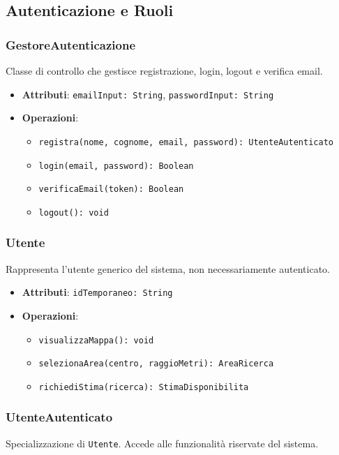 \documentclass[12pt,a4paper]{article}
\begin{document}
\subsection{Autenticazione e Ruoli}

\subsubsection{GestoreAutenticazione}
Classe di controllo che gestisce registrazione, login, logout e verifica email.

\begin{itemize}
    \item \textbf{Attributi}: \texttt{emailInput: String}, \texttt{passwordInput: String}
    \item \textbf{Operazioni}:
    \begin{itemize}
        \item \texttt{registra(nome, cognome, email, password): UtenteAutenticato}
        \item \texttt{login(email, password): Boolean}
        \item \texttt{verificaEmail(token): Boolean}
        \item \texttt{logout(): void}
    \end{itemize}
\end{itemize}

\subsubsection{Utente}
Rappresenta l’utente generico del sistema, non necessariamente autenticato.

\begin{itemize}
    \item \textbf{Attributi}: \texttt{idTemporaneo: String}
    \item \textbf{Operazioni}:
    \begin{itemize}
        \item \texttt{visualizzaMappa(): void}
        \item \texttt{selezionaArea(centro, raggioMetri): AreaRicerca}
        \item \texttt{richiediStima(ricerca): StimaDisponibilita}
    \end{itemize}
\end{itemize}

\subsubsection{UtenteAutenticato}
Specializzazione di \texttt{Utente}. Accede alle funzionalità riservate del sistema.
\end{document}
